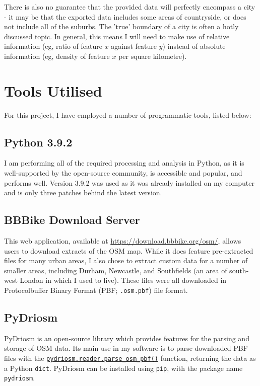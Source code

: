 \documentclass[11pt]{article} %
\begin{document}
There is also no guarantee that the provided data will perfectly encompass a city - it may be that the exported data includes some areas of countryside, or does not include all of the suburbs. The 'true' boundary of a city is often a hotly discussed topic. In general, this means I will need to make use of relative information (eg, ratio of feature $x$ against feature $y$) instead of absolute information (eg, density of feature $x$ per square kilometre).


\section{Tools Utilised}
For this project, I have employed a number of programmatic tools, listed below:

\subsection{Python 3.9.2}
I am performing all of the required processing and analysis in Python, as it is well-supported by the open-source community, is accessible and popular, and performs well. Version 3.9.2 was used as it was already installed on my computer and is only three patches behind the latest version.

\subsection{BBBike Download Server}
This web application, available at \href{https://download.bbbike.org/osm/}{https://download.bbbike.org/osm/}, allows users to download extracts of the OSM map. While it does feature pre-extracted files for many urban areas, I also chose to extract custom data for a number of smaller areas, including Durham, Newcastle, and Southfields (an area of south-west London in which I used to live). These files were all downloaded in Protocolbuffer Binary Format (PBF; \texttt{.osm.pbf}) file format.

\subsection{PyDriosm}
PyDriosm is an open-source library which provides features for the parsing and storage of OSM data. Its main use in my software is to parse downloaded PBF files with the \href{https://pydriosm.readthedocs.io/en/latest/_generated/pydriosm.reader.parse_osm_pbf.html}{\texttt{pydriosm.reader.parse\_osm\_pbf()}} function, returning the data as a Python \texttt{dict}. PyDriosm can be installed using \texttt{pip}, with the package name \texttt{pydriosm}.
\end{document}
